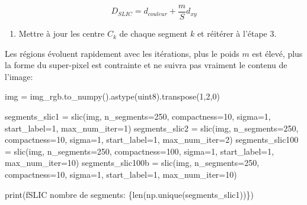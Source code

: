\documentclass[
  french,
  11pt,
  letterpaper,
  open=any,
  twoside=false,
  french]{scrbook}
\newenvironment{Shaded}{\begin{snugshade}}{\end{snugshade}}
\newcommand{\BuiltInTok}[1]{\textcolor[rgb]{0.00,0.23,0.31}{#1}}
\newcommand{\DecValTok}[1]{\textcolor[rgb]{0.68,0.00,0.00}{#1}}
\newcommand{\NormalTok}[1]{\textcolor[rgb]{0.00,0.23,0.31}{#1}}
\newcommand{\OperatorTok}[1]{\textcolor[rgb]{0.37,0.37,0.37}{#1}}
\newcommand{\SpecialCharTok}[1]{\textcolor[rgb]{0.37,0.37,0.37}{#1}}
\newcommand{\SpecialStringTok}[1]{\textcolor[rgb]{0.13,0.47,0.30}{#1}}
\newcommand{\StringTok}[1]{\textcolor[rgb]{0.13,0.47,0.30}{#1}}
\providecommand{\tightlist}{%
  \setlength{\itemsep}{0pt}\setlength{\parskip}{0pt}}
\begin{document}
\[
D_{SLIC}= d_{couleur} + \frac{m}{S}d_{xy}
\]

\begin{enumerate}
\def\labelenumi{\arabic{enumi}.}
\setcounter{enumi}{3}
\tightlist
\item
  Mettre à jour les centre \(C_k\) de chaque segment \(k\) et réitérer à
  l'étape 3.
\end{enumerate}

Les régions évoluent rapidement avec les itérations, plus le poids \(m\)
est élevé, plus la forme du super-pixel est contrainte et ne suivra pas
vraiment le contenu de l'image:

\begin{Shaded}
\begin{Highlighting}[]
\NormalTok{img }\OperatorTok{=}\NormalTok{ img\_rgb.to\_numpy().astype(}\StringTok{\textquotesingle{}uint8\textquotesingle{}}\NormalTok{).transpose(}\DecValTok{1}\NormalTok{,}\DecValTok{2}\NormalTok{,}\DecValTok{0}\NormalTok{) }

\NormalTok{segments\_slic1 }\OperatorTok{=}\NormalTok{ slic(img, n\_segments}\OperatorTok{=}\DecValTok{250}\NormalTok{, compactness}\OperatorTok{=}\DecValTok{10}\NormalTok{, sigma}\OperatorTok{=}\DecValTok{1}\NormalTok{, start\_label}\OperatorTok{=}\DecValTok{1}\NormalTok{, max\_num\_iter}\OperatorTok{=}\DecValTok{1}\NormalTok{)}
\NormalTok{segments\_slic2 }\OperatorTok{=}\NormalTok{ slic(img, n\_segments}\OperatorTok{=}\DecValTok{250}\NormalTok{, compactness}\OperatorTok{=}\DecValTok{10}\NormalTok{, sigma}\OperatorTok{=}\DecValTok{1}\NormalTok{, start\_label}\OperatorTok{=}\DecValTok{1}\NormalTok{, max\_num\_iter}\OperatorTok{=}\DecValTok{2}\NormalTok{)}
\NormalTok{segments\_slic100 }\OperatorTok{=}\NormalTok{ slic(img, n\_segments}\OperatorTok{=}\DecValTok{250}\NormalTok{, compactness}\OperatorTok{=}\DecValTok{100}\NormalTok{, sigma}\OperatorTok{=}\DecValTok{1}\NormalTok{, start\_label}\OperatorTok{=}\DecValTok{1}\NormalTok{, max\_num\_iter}\OperatorTok{=}\DecValTok{10}\NormalTok{)}
\NormalTok{segments\_slic100b }\OperatorTok{=}\NormalTok{ slic(img, n\_segments}\OperatorTok{=}\DecValTok{250}\NormalTok{, compactness}\OperatorTok{=}\DecValTok{10}\NormalTok{, sigma}\OperatorTok{=}\DecValTok{1}\NormalTok{, start\_label}\OperatorTok{=}\DecValTok{1}\NormalTok{, max\_num\_iter}\OperatorTok{=}\DecValTok{10}\NormalTok{)}

\BuiltInTok{print}\NormalTok{(}\SpecialStringTok{f\textquotesingle{}SLIC nombre de segments: }\SpecialCharTok{\{}\BuiltInTok{len}\NormalTok{(np.unique(segments\_slic1))}\SpecialCharTok{\}}\SpecialStringTok{\textquotesingle{}}\NormalTok{)}


\end{Highlighting}
\end{Shaded}
\end{document}
